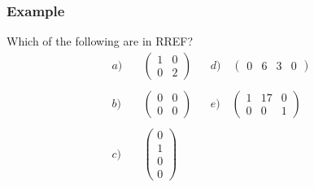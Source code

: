 \begin{frame}
\frametitle{Example}

Which of the following are in RREF? 
\begin{align*}
    a) \quad & \begin{pmatrix} 1 & 0\\0 & 2 \end{pmatrix} 
    && d) \quad \begin{pmatrix} 0 & 6 & 3 & 0 \end{pmatrix} \\ \\
    b) \quad & \begin{pmatrix} 0 & 0 \\ 0 & 0 \end{pmatrix} 
    && e) \quad \begin{pmatrix} 1 & 17 & 0\\ 0 & 0 & 1\end{pmatrix} \\ \\
    c) \quad & \begin{pmatrix} 0 \\ 1 \\ 0 \\ 0 \end{pmatrix} 
\end{align*}

\end{frame}



    
    


